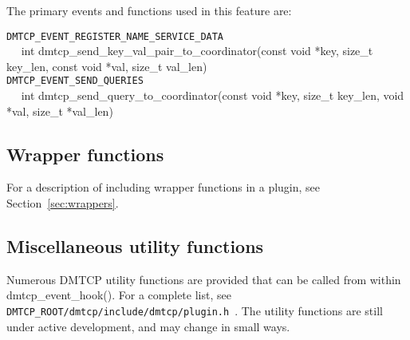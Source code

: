 \documentclass{article}
\begin{document}
The primary events and functions used in this feature are:

\noindent
{\tt DMTCP\_EVENT\_REGISTER\_NAME\_SERVICE\_DATA} \\
\hbox{\ \ }
int dmtcp\_send\_key\_val\_pair\_to\_coordinator(const void *key,
                                                   size\_t key\_len,
                                                   const void *val,
                                                   size\_t val\_len) \\
{\tt DMTCP\_EVENT\_SEND\_QUERIES} \\
\hbox{\ \ }
int dmtcp\_send\_query\_to\_coordinator(const void *key, size\_t key\_len,
                                            void *val, size\_t *val\_len)

\subsection{Wrapper functions}

For a description of including wrapper functions in a plugin, see
Section~\ref{sec:wrappers}.

\subsection{Miscellaneous utility functions}

Numerous DMTCP utility functions are provided that can be called from within
dmtcp\_event\_hook().  For a complete list, see
{\tt DMTCP\_ROOT/dmtcp/include/dmtcp/plugin.h}~.
The utility functions are still under active development, and may change
in small ways.
\end{document}
